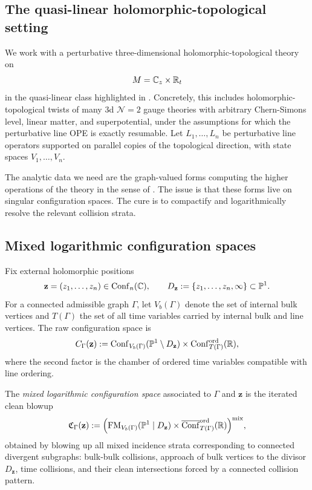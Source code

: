 \subsection{The quasi-linear holomorphic-topological setting}
We work with a perturbative three-dimensional holomorphic-topological theory on
\[
 M=\mathbb C_z\times \mathbb R_t
\]
in the quasi-linear class highlighted in \cite{DNP25}. Concretely, this includes holomorphic-topological twists of many $3$d $\mathcal N=2$ gauge theories with arbitrary Chern-Simons level, linear matter, and superpotential, under the assumptions for which the perturbative line OPE is exactly resumable. Let $L_1,\dots,L_n$ be perturbative line operators supported on parallel copies of the topological direction, with state spaces $V_1,\dots,V_n$.

The analytic data we need are the graph-valued forms computing the higher operations of the theory in the sense of \cite{GKW25,DNP25}. The issue is that these forms live on singular configuration spaces. The cure is to compactify and logarithmically resolve the relevant collision strata.

\subsection{Mixed logarithmic configuration spaces}
Fix external holomorphic positions
\[
 \mathbf z=(z_1,\dots,z_n)\in \mathrm{Conf}_n(\mathbb C),
 \qquad
 D_{\mathbf z}:=\{z_1,\dots,z_n,\infty\}\subset \mathbb P^1.
\]
For a connected admissible graph $\Gamma$, let $V_b(\Gamma)$ denote the set of internal bulk vertices and $T(\Gamma)$ the set of all time variables carried by internal bulk and line vertices. The raw configuration space is
\[
 C_\Gamma(\mathbf z)
 :=
 \mathrm{Conf}_{V_b(\Gamma)}(\mathbb P^1\setminus D_{\mathbf z})
 \times
 \mathrm{Conf}_{T(\Gamma)}^{\mathrm{ord}}(\mathbb R),
\]
where the second factor is the chamber of ordered time variables compatible with line ordering.

\begin{definition}%
The \emph{mixed logarithmic configuration space} associated to $\Gamma$ and $\mathbf z$ is the iterated clean blowup
\[
 \mathfrak C_\Gamma(\mathbf z)
 :=
 \Big(
 \mathrm{FM}_{V_b(\Gamma)}(\mathbb P^1\mid D_{\mathbf z})
 \times
 \overline{\mathrm{Conf}}^{\mathrm{ord}}_{T(\Gamma)}(\mathbb R)
 \Big)^{\mathrm{mix}},
\]
obtained by blowing up all mixed incidence strata corresponding to connected divergent subgraphs: bulk-bulk collisions, approach of bulk vertices to the divisor $D_{\mathbf z}$, time collisions, and their clean intersections forced by a connected collision pattern.
\end{definition}

